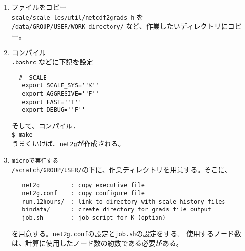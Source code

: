\begin{enumerate}
\item ファイルをコピー\\
 \verb|scale/scale-les/util/netcdf2grads_h| を \verb|/data/GROUP/USER/WORK_directory/| など、作業したいディレクトリにコピー。
\item コンパイル\\
 \verb|.bashrc| などに下記を設定
 \begin{verbatim}
  #--SCALE
   export SCALE_SYS=''K''
   export AGGRESIVE=''F''
   export FAST=''T''
   export DEBUG=''F''
 \end{verbatim}
 そして、コンパイル．\\
 \verb|$ make|\\
 うまくいけば、\verb|net2g|が作成される。
\item \verb|microで実行する| \\
 \verb|/scratch/GROUP/USER/|の下に、作業ディレクトリを用意する。そこに、
 \begin{verbatim}
   net2g         : copy executive file
   net2g.conf    : copy configure file
   run.12hours/  : link to directory with scale history files
   bindata/      : create directory for grads file output
   job.sh        : job script for K (option)
 \end{verbatim}
 を用意する。\verb|net2g.conf|の設定と\verb|job.sh|の設定をする。
 使用するノード数は、計算に使用したノード数の約数である必要がある。
\end{enumerate}



